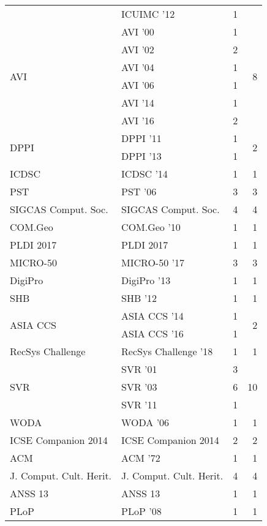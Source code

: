 \begin{table*}[t]
\begin{tabular}{llrr}
& ICUIMC '12 & 1 &\\
\multirow{6}{*}{AVI } & AVI '00 & 1 & \multirow{6}{*}{8}\\
& AVI '02 & 2 &\\
& AVI '04 & 1 &\\
& AVI '06 & 1 &\\
& AVI '14 & 1 &\\
& AVI '16 & 2 &\\
\multirow{2}{*}{DPPI } & DPPI '11 & 1 & \multirow{2}{*}{2}\\
& DPPI '13 & 1 &\\
\multirow{1}{*}{ICDSC } & ICDSC '14 & 1 & \multirow{1}{*}{1}\\
\multirow{1}{*}{PST } & PST '06 & 3 & \multirow{1}{*}{3}\\
\multirow{1}{*}{SIGCAS Comput. Soc.} & SIGCAS Comput. Soc. & 4 & \multirow{1}{*}{4}\\
\multirow{1}{*}{COM.Geo } & COM.Geo '10 & 1 & \multirow{1}{*}{1}\\
\multirow{1}{*}{PLDI 2017} & PLDI 2017 & 1 & \multirow{1}{*}{1}\\
\multirow{1}{*}{MICRO-50 } & MICRO-50 '17 & 3 & \multirow{1}{*}{3}\\
\multirow{1}{*}{DigiPro } & DigiPro '13 & 1 & \multirow{1}{*}{1}\\
\multirow{1}{*}{SHB } & SHB '12 & 1 & \multirow{1}{*}{1}\\
\multirow{2}{*}{ASIA CCS } & ASIA CCS '14 & 1 & \multirow{2}{*}{2}\\
& ASIA CCS '16 & 1 &\\
\multirow{1}{*}{RecSys Challenge } & RecSys Challenge '18 & 1 & \multirow{1}{*}{1}\\
\multirow{3}{*}{SVR } & SVR '01 & 3 & \multirow{3}{*}{10}\\
& SVR '03 & 6 &\\
& SVR '11 & 1 &\\
\multirow{1}{*}{WODA } & WODA '06 & 1 & \multirow{1}{*}{1}\\
\multirow{1}{*}{ICSE Companion 2014} & ICSE Companion 2014 & 2 & \multirow{1}{*}{2}\\
\multirow{1}{*}{ACM } & ACM '72 & 1 & \multirow{1}{*}{1}\\
\multirow{1}{*}{J. Comput. Cult. Herit.} & J. Comput. Cult. Herit. & 4 & \multirow{1}{*}{4}\\
\multirow{1}{*}{ANSS 13} & ANSS 13 & 1 & \multirow{1}{*}{1}\\
\multirow{1}{*}{PLoP } & PLoP '08 & 1 & \multirow{1}{*}{1}\\

\end{tabular}
\end{table*}
